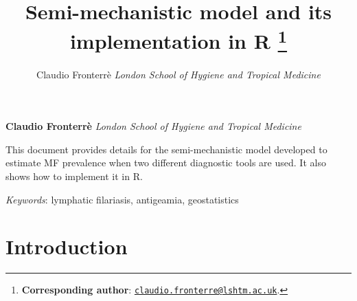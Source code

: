\documentclass[11pt,]{article}
\title{Semi-mechanistic model and its implementation in R \thanks{\textbf{Corresponding author}:
\href{mailto:claudio.fronterre@lshtm.ac.uk}{\nolinkurl{claudio.fronterre@lshtm.ac.uk}}.}  }
\author{\Large Claudio Fronterrè\vspace{0.05in} \newline\normalsize\emph{London School of Hygiene and Tropical Medicine}  }
\date{}
\newcommand*{\authorfont}{\fontfamily{phv}\selectfont}
\renewenvironment{abstract}
 {{%
    \setlength{\leftmargin}{0mm}
    \setlength{\rightmargin}{\leftmargin}%
  }%
  \relax}
 {\endlist}
\begin{document}
	
%

{%
\setlength{\parindent}{0pt}
\thispagestyle{plain}
{\fontsize{18}{20}\selectfont\raggedright 
\maketitle  %

}

{
   \vskip 13.5pt\relax \normalsize\fontsize{11}{12} 
\textbf{\authorfont Claudio Fronterrè} \hskip 15pt \emph{\small London School of Hygiene and Tropical Medicine}   

}

}








\begin{abstract}

    \hbox{\vrule height .2pt width 39.14pc}

    \vskip 8.5pt %

\noindent This document provides details for the semi-mechanistic model developed
to estimate MF prevalence when two different diagnostic tools are used.
It also shows how to implement it in R.


\vskip 8.5pt \noindent \emph{Keywords}: lymphatic filariasis, antigeamia, geostatistics \par

    \hbox{\vrule height .2pt width 39.14pc}



\end{abstract}


\vskip 6.5pt


\noindent  \section{Introduction}\label{introduction}
\end{document}
